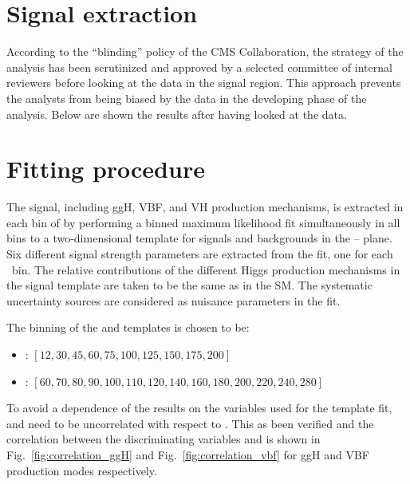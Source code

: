 \section{Signal extraction}
\label{sec:Signal extraction}

According to the ``blinding'' policy of the CMS Collaboration, the strategy of the analysis has been scrutinized and approved by a selected committee of internal reviewers before looking at the data in the signal region. This approach prevents the analysts from being biased by the data in the developing phase of the analysis. Below are shown the results after having looked at the data.


\section{Fitting procedure}\label{sec:fit}

The signal, including ggH, VBF, and VH production mechanisms, is extracted in each bin of \pth{} by performing a binned maximum likelihood fit simultaneously in all \pth{} bins to a two-dimensional template for signals and backgrounds in the \mll--\mt{} plane.
Six different signal strength parameters are extracted from the fit, one for each \pth~bin. The relative contributions of the different Higgs production mechanisms in the signal template are taken to be the same as in the SM. The systematic uncertainty sources are considered as nuisance parameters in the fit.

The binning of the \mll and \mt templates is chosen to be:
\begin{itemize}
\item {\mll: $[12,30,45,60,75,100,125,150,175,200]$} 
\item {\mt: $[60,70,80,90,100,110,120,140,160,180,200,220,240,280]$}
\end{itemize}

To avoid a dependence of the results on the variables used for the template fit, \mll and \mt need to be uncorrelated with respect to \pth.
This as been verified and the correlation between the discriminating variables and \pth is shown in Fig.~\ref{fig:correlation_ggH} and Fig.~\ref{fig:correlation_vbf} for ggH and VBF production modes respectively.


